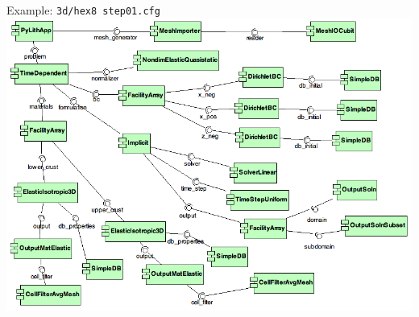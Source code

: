 \documentclass[pdftex,cig,slideColor]{pp4slides}
\begin{document}
\foilhead{\ }

\vspace*{-1.0in}%
{\large Example: {\tt 3d/hex8 step01.cfg}}\\
\includegraphics[scale=0.84]{figs/step01_components}

  \summary{}
\end{document}
